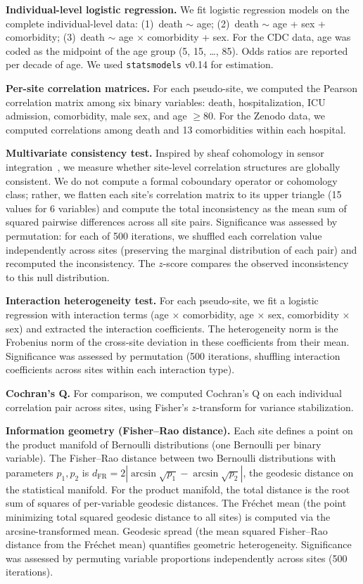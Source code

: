 \documentclass{article}
\begin{document}
\textbf{Individual-level logistic regression.}  We fit logistic regression
models on the complete individual-level data: (1)~death $\sim$ age; (2)~death
$\sim$ age + sex + comorbidity; (3)~death $\sim$ age $\times$ comorbidity +
sex.  For the CDC data, age was coded as the midpoint of the age group (5, 15,
\ldots, 85).  Odds ratios are reported per decade of age.  We used
\texttt{statsmodels} v0.14 for estimation.

\textbf{Per-site correlation matrices.}  For each pseudo-site, we computed the
Pearson correlation matrix among six binary variables: death, hospitalization,
ICU admission, comorbidity, male sex, and age $\geq 80$.  For the Zenodo data,
we computed correlations among death and 13 comorbidities within each hospital.

\textbf{Multivariate consistency test.}  Inspired by sheaf cohomology in sensor
integration~\cite{robinson2017sheaf}, we measure whether site-level
correlation structures are globally consistent.  We do not compute a formal
coboundary operator or cohomology class; rather, we flatten each site's
correlation matrix to its upper triangle (15 values for 6 variables) and
compute the total inconsistency as the mean sum of squared pairwise
differences across all site pairs.  Significance was assessed by permutation:
for each of 500 iterations, we shuffled each correlation value independently
across sites (preserving the marginal distribution of each pair) and
recomputed the inconsistency.  The $z$-score compares the observed
inconsistency to this null distribution.

\textbf{Interaction heterogeneity test.}  For each pseudo-site, we fit a
logistic regression with interaction terms (age $\times$ comorbidity,
age $\times$ sex, comorbidity $\times$ sex) and extracted the interaction
coefficients.  The heterogeneity norm is the Frobenius norm of the cross-site
deviation in these coefficients from their mean.  Significance was assessed by
permutation (500 iterations, shuffling interaction coefficients across sites
within each interaction type).

\textbf{Cochran's Q.}  For comparison, we computed Cochran's Q on each
individual correlation pair across sites, using Fisher's $z$-transform for
variance stabilization.

\textbf{Information geometry (Fisher--Rao distance).}  Each site defines a
point on the product manifold of Bernoulli distributions (one Bernoulli per
binary variable).  The Fisher--Rao distance between two Bernoulli distributions
with parameters $p_1, p_2$ is $d_{\text{FR}} = 2|\arcsin\sqrt{p_1} -
\arcsin\sqrt{p_2}|$, the geodesic distance on the statistical manifold.  For
the product manifold, the total distance is the root sum of squares of
per-variable geodesic distances.  The Fr\'{e}chet mean (the point minimizing
total squared geodesic distance to all sites) is computed via the
arcsine-transformed mean.  Geodesic spread (the mean squared Fisher--Rao
distance from the Fr\'{e}chet mean) quantifies geometric heterogeneity.
Significance was assessed by permuting variable proportions independently
across sites (500 iterations).
\end{document}
